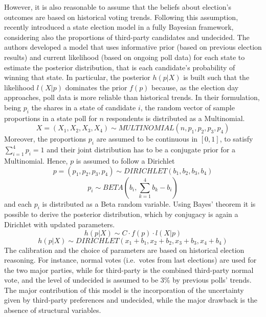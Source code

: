 \documentclass[
  12pt]{article}
\begin{document}
However, it is also reasonable to assume that the beliefs about
election's outcomes are based on historical voting trends. Following
this assumption, \citet{rig:2009} recently introduced a state election
model in a fully Bayesian framework, considering also the proportions of
third-party candidates and undecided. The authors developed a model that
uses informative prior (based on previous election results) and current
likelihood (based on ongoing poll data) for each state to estimate the
posterior distribution, that is each candidate's probability of winning
that state. In particular, the posterior \(h(p|X)\) is built such that
the likelihood \(l(X|p)\) dominates the prior \(f(p)\) because, as the
election day approaches, poll data is more reliable than historical
trends. In their formulation, being \(p_i\) the shares in a state of
candidate \(i\), the random vector of sample proportions in a state poll
for \(n\) respondents is distributed as a Multinomial.
\[X = (X_1, X_2, X_3, X_4) \sim MULTINOMIAL(n, p_1, p_2, p_3, p_4)\]
Moreover, the proportions \(p_i\) are assumed to be continuous in
\([0,1]\), to satisfy \(\sum_{i = 1}^{4} p_i = 1\) and their joint
distribution has to be a conjugate prior for a Multinomial. Hence, \(p\)
is assumed to follow a Dirichlet
\[p = (p_1, p_2, p_3, p_4) \sim DIRICHLET(b_1, b_2, b_3, b_4)\]
\[p_i \sim BETA(b_i, \sum_{k = 1}^{4} b_k - b_i)\] and each \(p_i\) is
distributed as a Beta random variable. Using Bayes' theorem it is
possible to derive the posterior distribution, which by conjugacy is
again a Dirichlet with updated parameters.
\[h(p|X) \sim C \cdot f(p) \cdot l(X|p)\]
\[h(p|X) \sim DIRICHLET(x_1 + b_1, x_2 + b_2, x_3 + b_3, x_4 + b_4)\]
The calibration and the choice of parameters are based on historical
election reasoning. For instance, normal votes (i.e.~votes from last
elections) are used for the two major parties, while for third-party is
the combined third-party normal vote, and the level of undecided is
assumed to be 3\% by previous polls' trends. The major contribution of
this model is the incorporation of the uncertainty given by third-party
preferences and undecided, while the major drawback is the absence of
structural variables.
\end{document}
